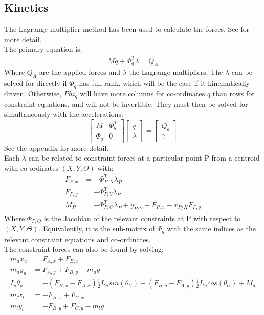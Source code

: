 \subsection{Kinetics}
The Lagrange multiplier method has been used to calculate the forces. See \cite{Schilder2018} for more detail.\\

The primary equation is:
\begin{eqnarray}
M\ddot{q}+\Phi_q^T\lambda=Q_A \label{eq:lambda}
\end{eqnarray}
Where $Q_A$ are the applied forces and $\lambda$ the Lagrange multipliers. The $\lambda$ can be solved for directly if $\Phi_q$ has full rank, which will be the case if it kinematically driven. Otherwise, $Phi_q$ will have more columns for co-ordinates $q$ than rows for constraint equations, and will not be invertible. They must then be solved for simultaneously with the accelerations:
\begin{equation}
\begin{bmatrix}
M &\Phi_q^T \\
\Phi_q &0
\end{bmatrix}
\begin{bmatrix}
\ddot{q} \\
\lambda
\end{bmatrix}
=
\begin{bmatrix}
Q_a \\
\gamma
\end{bmatrix} \label{eq:EoM}
\end{equation}
See the appendix for more detail.\\

Each $\lambda$ can be related to constraint forces at a particular point P from a centroid with co-ordinates $(X,Y,\Theta)$ with:
\begin{equation}
\begin{aligned}
F_{P,x}&=-\Phi_{P,X}^T\lambda_P \\
F_{P,y}&=-\Phi_{P,Y}^T\lambda_P \\
M_P    &=-\Phi_{P,\Theta}^T\lambda_P+y_{P/Y}-F_{P,x}-x_{P/X}F_{P,y}
\end{aligned}
\end{equation}
Where $\Phi_{P,\Theta}$ is the Jacobian of the relevant constraints at P with respect to $(X,Y,\Theta)$. Equivalently, it is the sub-matrix of $\Phi_q$ with the same indices as the relevant constraint equations and co-ordinates.\\

The constraint forces can also be found by solving:
\begin{equation}
\begin{aligned}
m_u \ddot{x}_u &= F_{A,x}+F_{B,x} \\ 
m_u \ddot{y}_u &= F_{A,y}+F_{B,y} -m_u g \\
I_u \ddot{\theta_u}&=-(F_{B,x}-F_{A,x})\tfrac{1}{2}L_usin(\theta_U)+(F_{B,y}-F_{A,y})\tfrac{1}{2}L_ucos(\theta_U)+M_a\\
m_l \ddot{x}_l &= -F_{B,x}+F_{C,x} \\ 
m_l \ddot{y}_l &= -F_{B,y}+F_{C,y} -m_l g\\
\end{aligned}
\end{equation}


